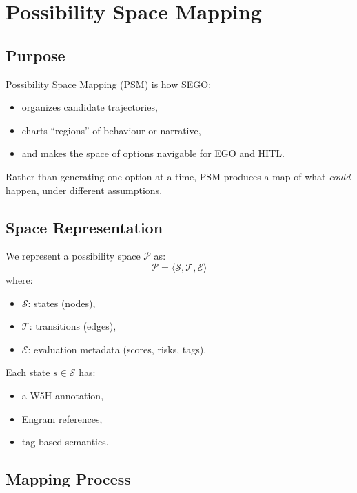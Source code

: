\chapter{Possibility Space Mapping}
\label{chap:Possibility_Space_Mapping}

\section{Purpose}

Possibility Space Mapping (PSM) is how SEGO:
\begin{itemize}
    \item organizes candidate trajectories,
    \item charts ``regions'' of behaviour or narrative,
    \item and makes the space of options navigable for EGO and HITL.
\end{itemize}

Rather than generating one option at a time, PSM produces a map of
what \emph{could} happen, under different assumptions.

\section{Space Representation}

We represent a possibility space $\mathcal{P}$ as:
\[
\mathcal{P} = \langle \mathcal{S}, \mathcal{T}, \mathcal{E} \rangle
\]
where:
\begin{itemize}
    \item $\mathcal{S}$: states (nodes),
    \item $\mathcal{T}$: transitions (edges),
    \item $\mathcal{E}$: evaluation metadata (scores, risks, tags).
\end{itemize}

Each state $s \in \mathcal{S}$ has:
\begin{itemize}
    \item a W5H annotation,
    \item Engram references,
    \item tag-based semantics.
\end{itemize}

\section{Mapping Process}

